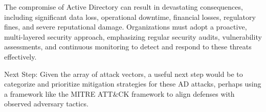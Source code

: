 The compromise of Active Directory can result in devastating consequences, including significant data loss, operational downtime, financial losses, regulatory fines, and severe reputational damage. Organizations must adopt a proactive, multi-layered security approach, emphasizing regular security audits, vulnerability assessments, and continuous monitoring to detect and respond to these threats effectively.

Next Step: Given the array of attack vectors, a useful next step would be to categorize and prioritize mitigation strategies for these AD attacks, perhaps using a framework like the MITRE ATT\&CK framework to align defenses with observed adversary tactics.
